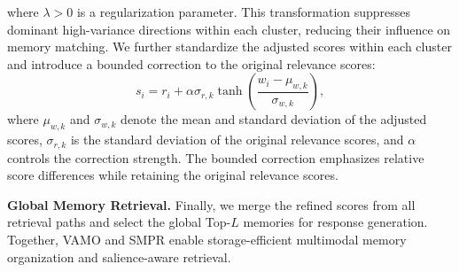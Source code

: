 where $\lambda>0$ is a regularization parameter.
This transformation suppresses dominant high-variance directions within each cluster, reducing their influence on memory matching.
We further standardize the adjusted scores within each cluster and introduce a bounded correction to the original relevance scores:
\begin{equation}
    s_i = r_i +
    \alpha \sigma_{r,k}
    \tanh\left(
    \frac{w_i-\mu_{w,k}}{\sigma_{w,k}}
    \right),
\end{equation}
where $\mu_{w,k}$ and $\sigma_{w,k}$ denote the mean and standard deviation of the adjusted scores, $\sigma_{r,k}$ is the standard deviation of the original relevance scores, and $\alpha$ controls the correction strength.
The bounded correction emphasizes relative score differences while retaining the original relevance scores.

\noindent \textbf{Global Memory Retrieval.}
Finally, we merge the refined scores from all retrieval paths and select the global Top-$L$ memories for response generation.
Together, VAMO and SMPR enable storage-efficient multimodal memory organization and salience-aware retrieval.




